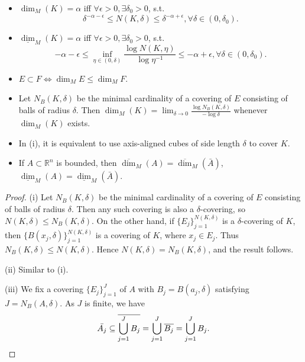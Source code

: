     \begin{remark}
        \begin{itemize}
            \item[(i)] $\operatorname{dim}_{M}(K) = \alpha$ iff $\forall \epsilon > 0, \exists \delta_{0}>0$, s.t.
            $$
            \delta^{-\alpha - \epsilon} \leq N(K,\delta) \leq \delta^{-\alpha + \epsilon}, \forall \delta \in (0,\delta_{0}).
            $$
            \item[(ii)] $\underline{\operatorname{dim}}_{M}(K) = \alpha$ iff $\forall \epsilon>0, \exists \delta_{0}>0$, s.t.
            $$
            -\alpha - \epsilon \leq \inf_{\eta \in (0,\delta)} \frac{\log N(K,\eta)}{\log \eta^{-1}} \leq -\alpha + \epsilon, \forall \delta \in (0,\delta_{0}).
            $$
            \item[(iii)] $E \subset F \Leftrightarrow \operatorname{dim}_{M} E \le \operatorname{dim}_{M} F$.
        \end{itemize}
    \end{remark}

    \begin{lemma}
        \begin{itemize}
            \item[(i)] Let $N_{B}(K,\delta)$ be the minimal cardinality of a covering of $E$ consisting of balls of radius $\delta$. Then $\operatorname{dim}_{M}(K)= \lim_{\delta \to 0}\frac{\log N_{B}(K,\delta)}{-\log \delta}$ whenever $\operatorname{dim}_{M}(K)$ exists.
            \item[(ii)] In (i), it is equivalent to use axis-aligned cubes of side length $\delta$ to cover $K$.
            \item[(iii)] If $A \subset \mathbb{R}^{n}$ is bounded, then $\overline{\operatorname{dim}}_{M}(A)=\overline{\operatorname{dim}}_{M}(\bar{A})$, $\underline{\operatorname{dim}}_{M}(A)=\underline{\operatorname{dim}}_{M}(\bar{A})$.
        \end{itemize}
    \end{lemma}

    \begin{proof}
        (i) Let $N_{B}(K,\delta)$ be the minimal cardinality of a covering of $E$ consisting of balls of radius $\delta$. Then any such covering is also a $\delta$-covering, so $N(K,\delta) \leq N_{B}(K,\delta)$. On the other hand, if $\{ E_{j} \}_{j=1}^{N(K,\delta)}$ is a $\delta$-covering of $K$, then $\{ B(x_{j},\delta) \}_{j=1}^{N(K,\delta)}$ is a covering of $K$, where $x_{j} \in E_{j}$. Thus $N_{B}(K,\delta) \leq N(K,\delta)$. Hence $N(K,\delta)=N_{B}(K,\delta)$, and the result follows.

        (ii) Similar to (i).

        (iii) We fix a covering $\{ E_{j} \}_{j=1}^{J}$ of $A$ with $B_{j}=B(a_{j},\delta)$ satisfying $J=N_{B}(A,\delta)$. As $J$ is finite, we have
        $$
        \bar{A_{j}} \subseteq \overline{\bigcup_{j=1}^{J} B_{j}} = \bigcup_{j=1}^{J} \overline{B_{j}} = \bigcup_{j=1}^{J} B_{j}.\qedhere
        $$
    \end{proof}

